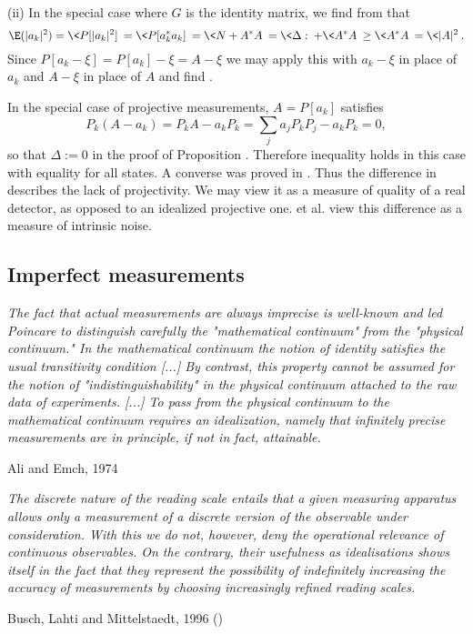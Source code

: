 \documentclass[12pt]{article}
\begin{document}
(ii) In the special case where $G$ is the identity matrix, we find from
 that
\[
\E(|a_k|^2)=\<P[|a_k|^2]\>=\<P[a_k^*a_k]\>=\<N+A^*A\>
=\<\Delta:\>+\<A^*A\>\ge \<A^*A\>=\<|A|^2\>.
\]
Since $P[a_k-\xi]=P[a_k]-\xi=A-\xi$ we may apply this with
$a_k-\xi$ in place of $a_k$ and $A-\xi$ in place of $A$ and find
.
\epf

In the special case of projective measurements, $A=P[a_k]$ satisfies
\[
P_k(A-a_k)=P_kA-a_kP_k=\sum_j a_jP_kP_j-a_kP_k=0,
\]
so that $\Delta:=0$ in the proof of Proposition .
Therefore inequality  holds in this case with equality 
for all states. A converse was proved in 
\cite[Proposition 2]{KruM}. Thus the difference in 
describes the lack of projectivity. We may view it as a measure of
quality of a real detector, as opposed to an idealized projective one.
 et al. \cite[(16)]{BusHL} view this difference as a measure
of intrinsic noise.



\subsection{Imperfect measurements}\label{ss.imp}

\nopagebreak
\hfill\parbox[t]{10.8cm}{\footnotesize

{\em
The fact that actual measurements are always imprecise is well-known
and led Poincare to distinguish carefully the "mathematical continuum"
from the "physical continuum." In the mathematical continuum the notion
of identity satisfies the usual transitivity condition [...]
By contrast, this property cannot be assumed for the notion of
"indistinguishability" in the physical continuum attached to the raw
data of experiments. [...]
To pass from the physical continuum to the mathematical continuum
requires an idealization, namely that infinitely precise measurements
are in principle, if not in fact, attainable.}

\hfill Ali and Emch, 1974 \cite[p.1545]{AliE.meas}
}

\bigskip

\nopagebreak
\hfill\parbox[t]{10.8cm}{\footnotesize

{\em The discrete nature of the reading scale entails that a given
measuring apparatus allows only a measurement of a discrete version of
the observable under consideration. With this we do not, however, deny
the operational relevance of continuous observables. On the contrary,
their usefulness as idealisations shows itself in the fact that they
represent the possibility of indefinitely increasing the accuracy of
measurements by choosing increasingly refined reading scales.
}

\hfill Busch, Lahti and Mittelstaedt, 1996 (\cite[p.81]{BusLM})
}
\end{document}
